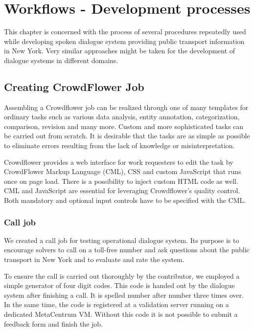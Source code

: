 \chapter{Workflows - Development processes} \label{ch:workflow}

This chapter is concerned with the process of several procedures repeatedly used while developing spoken dialogue system providing public transport information in New York.
Very similar approaches might be taken for the development of dialogue systems in different domains.


\section{Creating CrowdFlower Job}

Assembling a Crowdflower job can be realized through one of many templates for ordinary tasks such as various data analysis, entity annotation, categorization, comparison, revision and many more.%
Custom and more sophisticated tasks can be carried out from scratch.
It is desirable that the tasks are as simple as possible to eliminate errors resulting from the lack of knowledge or misinterpretation.

Crowdflower provides a web interface for work requesters to edit the task by CrowdFlower Markup Language (CML), CSS and custom JavaScript that runs once on page load.
There is a possibility to inject custom HTML code as well.
CML and JavaScript are essential for leveraging Crowdflower's quality control.
Both mandatory and optional input controls have to be specified with the CML.

\subsection{Call job}

We created a call job for testing operational dialogue system.
Its purpose is to encourage solvers to call on a toll-free number and ask questions about the public transport in New York and to evaluate and rate the system.

To ensure the call is carried out thoroughly by the contributor, we employed a simple generator of four digit codes.
This code is handed out by the dialogue system after finishing a call.
It is spelled number after number three times over.
In the same time, the code is registered at a validation server running on a dedicated MetaCentrum VM.
Without this code it is not possible to submit a feedback form and finish the job.

